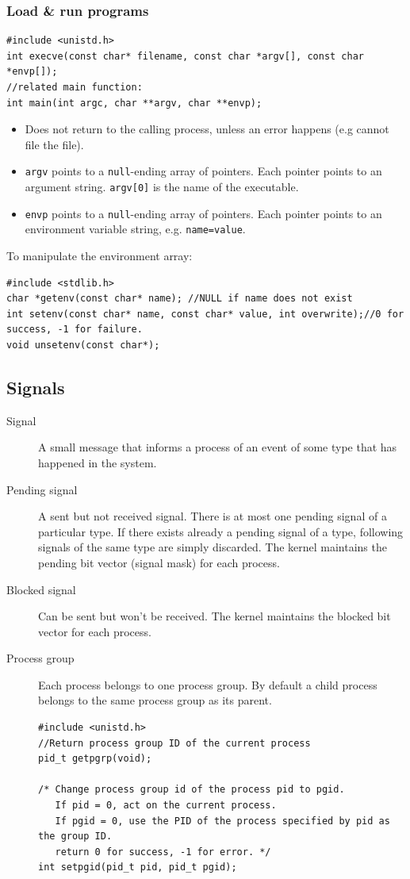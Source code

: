 \subsubsection{Load \& run programs}
\begin{lstlisting}[frame=single]
#include <unistd.h>
int execve(const char* filename, const char *argv[], const char *envp[]);
//related main function:
int main(int argc, char **argv, char **envp);
\end{lstlisting}
\begin{itemize}
\item Does not return to the calling process, unless an error happens (e.g cannot file the file).
\item \texttt{argv} points to a \texttt{null}-ending array of pointers. Each pointer points to an argument string. \texttt{argv[0]} is the name of the executable.
\item \texttt{envp} points to a \texttt{null}-ending array of pointers. Each pointer points to an environment variable string, e.g. \texttt{name=value}. 
\end{itemize}
To manipulate the environment array:
\begin{lstlisting}[frame=single]
#include <stdlib.h>
char *getenv(const char* name); //NULL if name does not exist
int setenv(const char* name, const char* value, int overwrite);//0 for success, -1 for failure.
void unsetenv(const char*);
\end{lstlisting}
\subsection{Signals}
\begin{description}
\item[Signal]A small message that informs a process of an event of some type that has happened in the system.
\item[Pending signal]A sent but not received signal. There is at most one pending signal of a particular type. If there exists already a pending signal of a type, following signals of the same type are simply discarded. The kernel maintains the pending bit vector (signal mask) for each process.
\item[Blocked signal]Can be sent but won't be received. The kernel maintains the blocked bit vector for each process.
\item[Process group]Each process belongs to one process group. By default a child process belongs to the same process group as its parent.
\begin{lstlisting}[frame=single]
#include <unistd.h>
//Return process group ID of the current process
pid_t getpgrp(void);

/* Change process group id of the process pid to pgid.
   If pid = 0, act on the current process.
   If pgid = 0, use the PID of the process specified by pid as the group ID.
   return 0 for success, -1 for error. */
int setpgid(pid_t pid, pid_t pgid);
\end{lstlisting}
\end{description}

